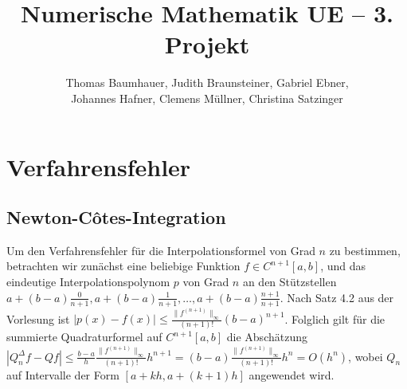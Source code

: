 \documentclass{scrbook}
\begin{document}
\title{Numerische Mathematik UE -- 3. Projekt}
\author{Thomas Baumhauer, Judith Braunsteiner, Gabriel Ebner, \\
  Johannes Hafner, Clemens Müllner, Christina Satzinger}
\maketitle

\chapter{Verfahrensfehler}

\section{Newton-Côtes-Integration}

Um den Verfahrensfehler für die Interpolationsformel von Grad \(n\) zu
bestimmen, betrachten wir zunächst eine beliebige Funktion \(f \in
C^{n+1}[a,b]\), und das eindeutige Interpolationspolynom \(p\) von Grad \(n\)
an den Stützstellen \(a + (b-a)\frac{0}{n+1}, a + (b-a)\frac{1}{n+1}, \dots, a
+ (b-a)\frac{n+1}{n+1}\).  Nach Satz 4.2 aus der Vorlesung ist \(|p(x) - f(x)|
\leq \frac{\|f^{(n+1)}\|_\infty}{(n+1)!}(b-a)^{n+1}\).  Folglich gilt für die
summierte Quadraturformel auf \(C^{n+1}[a,b]\) die Abschätzung \(|Q^{\Delta}_n
f - Q f| \leq \frac {b-a} h \frac{\|f^{(n+1)}\|_\infty}{(n+1)!}h^{n+1} = (b-a)
\frac{\|f^{(n+1)}\|_\infty}{(n+1)!}h^n = O(h^n)\), wobei \(Q_n\) auf Intervalle
der Form \([a + kh, a + (k+1)h]\) angewendet wird.

\end{document}

